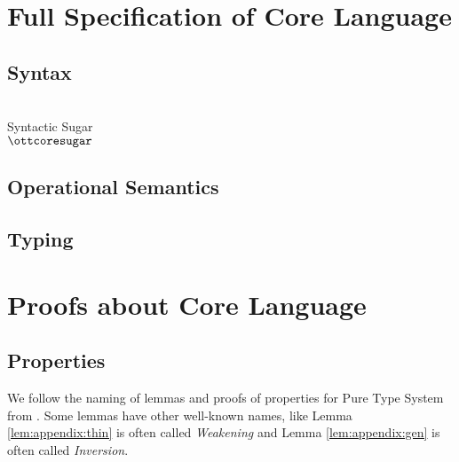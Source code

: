 \section{Full Specification of Core Language}

\subsection{Syntax}
\gram{\otte\ottinterrule
        \ottG\ottinterrule
        \ottv}
\\[2.0mm]
Syntactic Sugar\\
$\ottcoresugar$ %

\subsection{Operational Semantics}
\ottdefnstep{}
\ottusedrule{\ottdruleSXXMu{}}

\subsection{Typing}
\ottdefnctx{}\ottinterrule
\ottdefnexpr{}
\ottusedrule{\ottdruleTXXMu{}}

\section{Proofs about Core Language}
\subsection{Properties}
We follow the naming of lemmas and proofs of properties 
for Pure Type System from \cite{handbook}. Some lemmas have other well-known names, like
Lemma \ref{lem:appendix:thin} is often called \emph{Weakening} and 
Lemma \ref{lem:appendix:gen} is often called \emph{Inversion}.

